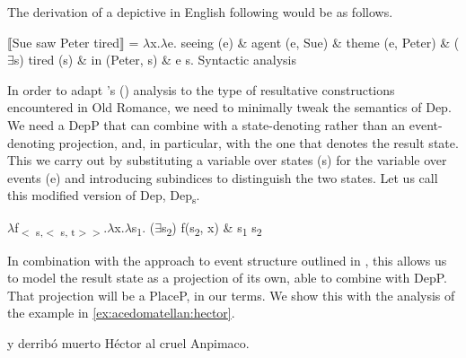 \documentclass[output=paper,colorlinks,citecolor=brown,
]{langscibook}
\begin{document}
The derivation of a depictive in English following \citeauthor{Pylkkanen2008} would be as follows.

\ea
  \ea $\llbracket$Sue saw Peter tired$\rrbracket$ = $\lambda$x.$\lambda$e. seeing (e) \& agent (e, Sue) \& theme (e, Peter) \& ($\exists$s) tired (s) \& in (Peter, s) \& e \textsubscript{\LARGE \textdegree} s.
  \ex Syntactic analysis\\
\z\z

\noindent In order to adapt \citeauthor{Pylkkanen2008}'s (\citeyear{Pylkkanen2008}) analysis to the type of resultative constructions encountered in Old Romance, we need to minimally tweak the semantics of Dep. We need a DepP that can combine with a state-denoting rather than an event-denoting projection, and, in particular, with the one that denotes the result state. This we carry out by substituting a variable over states (s) for the variable over events (e) and introducing subindices to distinguish the two states. Let us call this modified version of Dep, Dep\textsubscript{s}.

\ea
  $\lambda$f\textsubscript{$<$ s,$<$ s, t$> >$}.$\lambda$x.$\lambda$s\textsubscript{1}. ($\exists$s\textsubscript{2}) f(s\textsubscript{2}, x) \& s\textsubscript{1} \textsubscript{\LARGE \textdegree} s\textsubscript{2}
\z

In combination with the approach to event structure outlined in , this allows us to model the result state as a projection of its own, able to combine with DepP. That projection will be a PlaceP, in our terms. We show this with the analysis of the example in \ref{ex:acedomatellan:hector}.

\ea y derribó muerto Héctor al cruel Anpimaco.

\z
\end{document}

